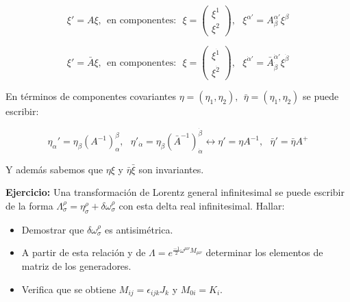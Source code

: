 \documentclass{article}
\begin{document}
         $$\xi '=A\xi, \ \ \text{en componentes:} \ \ \ \xi =\left ( \begin{array}{c}
              \xi ^1  \\
             \xi ^2
         \end{array}\right), \ \ \ \xi ^{\alpha '}=A ^{\alpha '}_\beta \xi ^\beta$$

         $$\xi '=\bar{A}\xi, \ \ \text{en componentes:} \ \ \ \xi =\left ( \begin{array}{c}
              \xi ^\dot{1}  \\
             \xi ^\dot{2}
         \end{array}\right), \ \ \ \xi ^{\dot{\alpha} '}=\bar{A} ^{\dot{\alpha} '}_{\dot{\beta}} \xi ^\dot{\beta}$$

        En términos de componentes covariantes $\eta =(\eta _1 , \eta _2), \ \ \bar{\eta}=(\eta _{\dot{1}},\eta _{\dot{2}})$ se puede escribir:

        $$\eta _{\alpha }' = \eta _{\beta} (A^{-1})^\beta _\alpha , \ \ \ \eta '_{\dot{\alpha}}=\eta _{\dot{ \beta}}(\bar{A}^{-1})^{\dot{\beta}}_{\dot{ \alpha}} \leftrightarrow \eta '=\eta A^{-1}, \ \ \ \bar{\eta}'=\bar{\eta}A^+$$

        Y además sabemos que $\eta \xi$ y $ \bar{\eta}\bar{\xi}$ son invariantes.

        \smallskip
        \textbf{Ejercicio:} Una transformación de Lorentz general infinitesimal se puede escribir de la forma $\Lambda _\sigma ^\rho = \eta ^\rho _\sigma + \delta \omega ^\rho _\sigma$ con esta delta real infinitesimal. Hallar:

        \begin{itemize}
            \item Demostrar que $ \delta \omega ^\rho _\sigma$ es antisimétrica.

            \item A partir de esta relación y de $\Lambda =e^{\frac{-1}{2}\omega ^{\mu \nu}M_{\mu \nu}}$ determinar los elementos de matriz de los generadores.

            \item Verifica que se obtiene $M_{ij}=\epsilon _{ijk}J_k$ y $M_{0i}=K_i$.
        \end{itemize}


        
\end{document}

